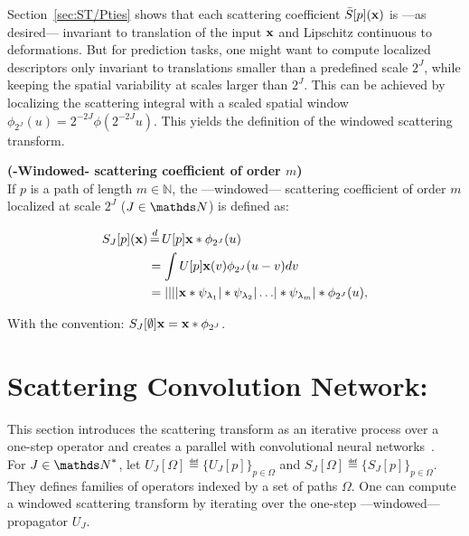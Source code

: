 \documentclass[a4paper,11pt]{report}
\begin{document}
      Section~\ref{sec:ST/Pties} shows that each scattering coefficient $\bar{S}[p]({\bf x})$ is ---as desired--- invariant to translation of the input ${\bf x}$ and Lipschitz continuous to deformations. But for prediction tasks, one might want to compute localized descriptors only invariant to translations smaller than a predefined scale $2^{J}$, while keeping the spatial variability at scales larger than $2^{J}$. This can be achieved by localizing the scattering integral with a scaled spatial window $\phi_{2^{J}}(u) = 2^{-2J} \phi(2^{-2J}u)$. This yields the definition of the windowed scattering transform.
      
      \begin{defn} \textbf{(-Windowed- scattering coefficient of order $m$)}\\
				If $p$ is a path of length $m \in \mathds{N}$, the ---windowed--- scattering coefficient of order $m$ localized at scale $2^{J}$ ($J \in \dsN$) is defined as:
				
				\begin{equation}
					\label{eq:ST windowed}
					\begin{split}
						S_{J}[p](\bfx) &\eqdef U[p]\bfx \ast \phi_{2^{J}}(u) \\
									&= \int U[p]\bfx(v) \phi_{2^{J}}(u-v) dv \\
									&= \abs{\abs{\abs{\abs{\bfx \ast \psi_{\lambda_{1}}} \ast \psi_{\lambda_{2}}} 
							\dots } \ast \psi_{\lambda_{m}}} \ast \phi_{2^{J}}(u),
					\end{split}
				\end{equation}
				
				With the convention: $S_{J}[\emptyset]{\bf x} = {\bf x} \ast \phi_{2^{J}}$.\\
      	\label{def:SC windozed}
      \end{defn}

		\section{Scattering Convolution Network:}
			\label{sec:ST/SCN}
			
			This section introduces the scattering transform as an iterative process over a one-step operator and creates a parallel with convolutional neural networks~\citep{lecun2010convolutional}.\\
			
			For $J \in \dsN^{\ast}$, let $U_{J}[\Omega] \eqdef \{U_{J}[p]\}_{p \in \Omega}$ and $S_{J}[\Omega] \eqdef \{S_{J}[p]\}_{p \in \Omega}$. They defines families of operators indexed by a set of paths $\Omega$. One can compute a windowed scattering transform by iterating over the one-step ---windowed--- propagator $U_{J}$.
			
\end{document}
